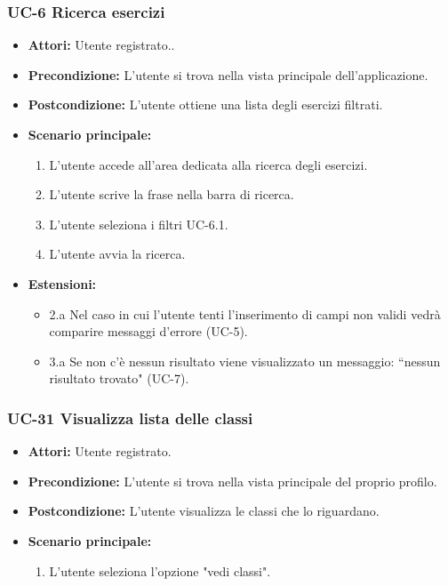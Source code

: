 \subsubsection{UC-6 Ricerca esercizi}
		\begin{itemize}
			\item\textbf{ Attori:} Utente registrato..
			\item \textbf{Precondizione:} L'utente si trova nella vista principale dell'applicazione.
			\item \textbf{Postcondizione:} L'utente ottiene una lista degli esercizi filtrati.
			\item \textbf{Scenario principale:}
				\begin{enumerate}
					\item L'utente accede all'area dedicata alla ricerca degli esercizi.
					\item L'utente scrive la frase nella barra di ricerca.
					\item L'utente seleziona i filtri UC-6.1.
					\item L'utente avvia la ricerca.
				\end{enumerate}
			\item \textbf{Estensioni:}
				\begin{itemize}
					\item 2.a Nel caso in cui l'utente tenti l'inserimento di campi non validi vedrà comparire messaggi d'errore (UC-5).
					\item 3.a Se non c'è nessun risultato viene visualizzato un messaggio: ``nessun risultato trovato" (UC-7).
				\end{itemize}
		\end{itemize}

\subsubsection{UC-31 Visualizza lista delle classi}		
\begin{itemize}
	\item \textbf{Attori:} Utente registrato.
	\item \textbf{Precondizione:} L'utente si trova nella vista principale del proprio profilo.
	\item \textbf{Postcondizione:} L'utente visualizza le classi che lo riguardano.
	\item \textbf{Scenario principale:}
	\begin{enumerate}
		\item L'utente seleziona l'opzione "vedi classi".
	\end{enumerate}		
\end{itemize}

